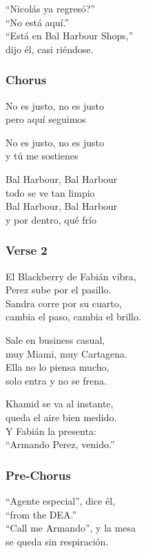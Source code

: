 ``Nicolás ya regresó?''\\
``No está aquí.''\\
``Está en Bal Harbour Shops,''\\
dijo él, casi riéndose.

\subsubsection{Chorus}\label{chorus-43}

No es justo, no es justo\\
pero aquí seguimos

No es justo, no es justo\\
y tú me sostienes

Bal Harbour, Bal Harbour\\
todo se ve tan limpio\\
Bal Harbour, Bal Harbour\\
y por dentro, qué frío

\subsubsection{Verse 2}\label{verse-2-13}

El Blackberry de Fabián vibra,\\
Perez sube por el pasillo.\\
Sandra corre por su cuarto,\\
cambia el paso, cambia el brillo.

Sale en business casual,\\
muy Miami, muy Cartagena.\\
Ella no lo piensa mucho,\\
solo entra y no se frena.

Khamid se va al instante,\\
queda el aire bien medido.\\
Y Fabián la presenta:\\
``Armando Perez, venido.''

\subsubsection{Pre-Chorus}\label{pre-chorus-30}

``Agente especial'', dice él,\\
``from the DEA.''\\
``Call me Armando'', y la mesa\\
se queda sin respiración.

